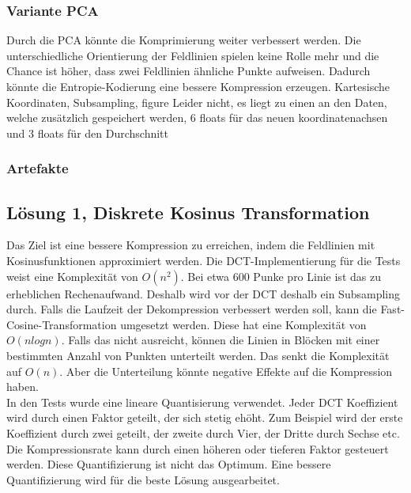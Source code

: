 \subsubsection{Variante PCA}
Durch die PCA könnte die Komprimierung weiter verbessert werden. Die unterschiedliche Orientierung der Feldlinien spielen keine Rolle mehr und die Chance ist höher, dass zwei Feldlinien ähnliche Punkte aufweisen. Dadurch könnte die Entropie-Kodierung eine bessere Kompression erzeugen.
Kartesische Koordinaten, Subsampling, 
figure
Leider nicht, es liegt zu einen an den Daten, welche zusätzlich gespeichert werden, 6 floats für das neuen koordinatenachsen und 3 floats für den Durchschnitt

\subsubsection{Artefakte}

\subsection{Lösung 1, Diskrete Kosinus Transformation}
Das Ziel ist eine bessere Kompression zu erreichen, indem die Feldlinien mit Kosinusfunktionen approximiert werden. 
Die DCT-Implementierung für die Tests weist eine Komplexität von $O(n^2)$. Bei etwa $600$ Punke pro Linie ist das zu erheblichen Rechenaufwand. Deshalb wird vor der DCT deshalb ein Subsampling durch. Falls die Laufzeit der Dekompression verbessert werden soll, kann die Fast-Cosine-Transformation umgesetzt werden. Diese hat eine Komplexität von $O(n log n)$. Falls das nicht ausreicht, können die Linien in Blöcken mit einer bestimmten Anzahl von Punkten unterteilt werden. Das senkt die Komplexität auf $O(n)$. Aber die Unterteilung könnte negative Effekte auf die Kompression haben.\\
[\baselineskip]
In den Tests wurde eine lineare Quantisierung verwendet. Jeder DCT Koeffizient wird durch einen Faktor geteilt, der sich stetig ehöht. Zum Beispiel wird der erste Koeffizient durch zwei geteilt, der zweite durch Vier, der Dritte durch Sechse etc.  Die Kompressionsrate kann durch einen höheren oder tieferen Faktor gesteuert werden. Diese Quantifizierung ist nicht das Optimum. Eine bessere Quantifizierung wird für die beste Lösung ausgearbeitet.

